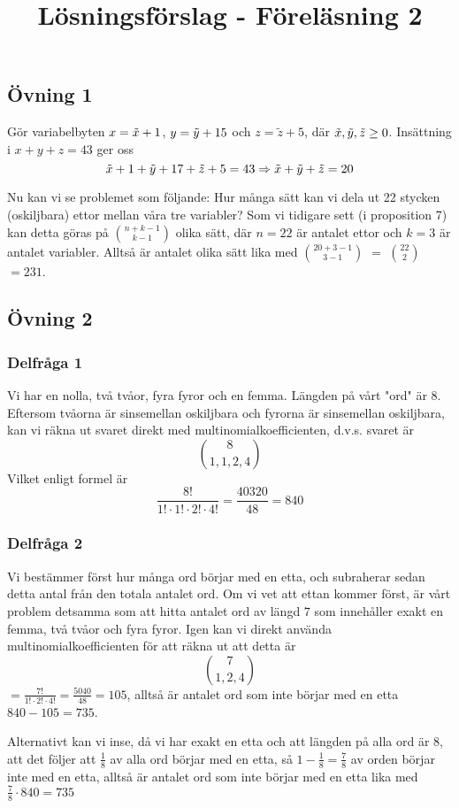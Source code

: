 \documentclass{article}
\title{Lösningsförslag - Föreläsning 2}
\begin{document}
\maketitle

\subsection*{Övning 1}
Gör variabelbyten $x=\Tilde{x} + 1$, $y = \Tilde{y} + 15$ och $z=\tilde{z}+5$, där $\Tilde{x}, \Tilde{y}, \Tilde{z}\geq 0$. Insättning i $x+y+z=43$ ger oss $$
\Tilde{x} + 1 + \Tilde{y} + 17 + \Tilde{z} + 5 = 43 \Rightarrow  \Tilde{x} +  \Tilde{y} +  \Tilde{z}= 20
$$

Nu kan vi se problemet som följande: Hur många sätt kan vi dela ut 22 stycken (oskiljbara) ettor mellan våra tre variabler? Som vi tidigare sett (i proposition 7) kan detta göras på $n + k - 1 \choose k - 1$ olika sätt, där $n=22$ är antalet ettor och $k=3$ är antalet variabler. Alltså är antalet olika sätt lika med $20 + 3 - 1 \choose 3 - 1$ $=$ $22 \choose 2$ $=231$. 

\subsection*{Övning 2}
\subsubsection*{Delfråga 1}
Vi har en nolla, två tvåor, fyra fyror och en femma. Längden på vårt "ord" är 8. Eftersom tvåorna är sinsemellan oskiljbara och fyrorna är sinsemellan oskiljbara, kan vi räkna ut svaret direkt med multinomialkoefficienten, d.v.s. svaret är $$
8 \choose 1, 1, 2, 4 
$$
Vilket enligt formel är $$
\frac{8!}{1!\cdot1!\cdot2!\cdot4!} = \frac{40320}{48}=840
$$
\subsubsection*{Delfråga 2}
Vi bestämmer först hur många ord börjar med en etta, och subraherar sedan detta antal från den totala antalet ord. Om vi vet att ettan kommer först, är vårt problem detsamma som att hitta antalet ord av längd 7 som innehåller exakt en femma, två tvåor och fyra fyror. Igen kan vi direkt använda multinomialkoefficienten för att räkna ut att detta är $$
7 \choose 1, 2, 4
$$
$=\frac{7!}{1!\cdot 2!\cdot 4!}=\frac{5040}{48}=105$, alltså är antalet ord som inte börjar med en etta $840-105=735$. 


Alternativt kan vi inse, då vi har exakt en etta och att längden på alla ord är 8, att det följer att $\frac{1}{8}$ av alla ord börjar med en etta, så $1-\frac{1}{8}=\frac{7}{8}$ av orden börjar inte med en etta, alltså är antalet ord som inte börjar med en etta lika med $\frac{7}{8}\cdot 840=735$
\end{document}
